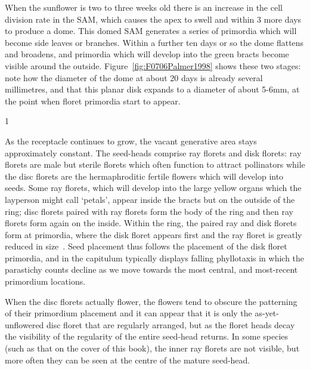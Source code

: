 When the sunflower is two to three weeks old there is an increase in the cell division rate in the SAM, which causes the apex to swell and within 3 more days to produce a dome. This domed SAM generates a series of primordia which will become side leaves or branches.%
Within a further ten days or so the dome flattens and broadens, and primordia which will develop into the green bracts become visible around the outside.  Figure~\ref{fig:F0706Palmer1998} shows these two stages:  note how the diameter of the dome at about 20 days is already several millimetres, and that this planar disk expands to a diameter of about 5-6mm, at the point when floret primordia start to appear.

%
{1}

 As the receptacle continues to grow, the vacant generative area stays approximately constant.%
 The seed-heads comprise  ray florets and disk florets: ray florets are male but sterile florets which often function to attract pollinators while the disc florets are the hermaphroditic fertile flowers which will develop into seeds. Some ray florets, which will develop into the large yellow organs which the layperson might call `petals', appear inside the bracts but on the outside of the ring; disc florets paired with ray florets form the body of the ring and then ray florets form again on the inside. Within the ring, the paired ray and disk florets form at primordia, where the disk floret appears first and the ray floret is greatly reduced in size~\autocite{hottonPossibleActualPhyllotaxis2006}.  Seed placement thus follows the placement of 
the disk floret primordia, and  in the capitulum typically displays falling phyllotaxis in which the parastichy counts decline as we move towards the most central, and most-recent primordium locations.

When the disc florets actually flower, the flowers tend to obscure the patterning of their primordium placement and it can appear that it is only the as-yet-unflowered disc floret that are regularly arranged, but as the floret heads decay the visibility of the regularity of the entire seed-head returns.    In some species (such as that on the cover of this book), the inner ray florets are not visible, but more often they can be seen at the centre of the mature seed-head.

